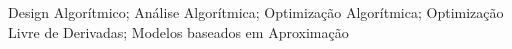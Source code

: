 \noindent Design Algorítmico; Análise Algorítmica; Optimização Algorítmica; Optimização Livre de Derivadas; Modelos baseados em Aproximação
